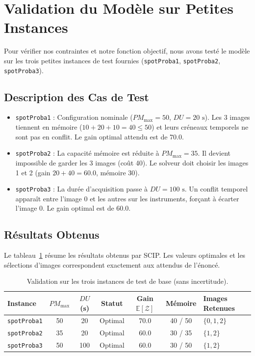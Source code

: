 \section{Validation du Modèle sur Petites Instances}

Pour vérifier nos contraintes et notre fonction objectif, nous avons testé le modèle sur les trois petites instances de test fournies (\texttt{spotProba1}, \texttt{spotProba2}, \texttt{spotProba3}).

\subsection{Description des Cas de Test}
\begin{itemize}
    \item \texttt{spotProba1} : Configuration nominale ($PM_{\max} = 50$, $DU = 20\text{ s}$). Les 3 images tiennent en mémoire ($10 + 20 + 10 = 40 \leq 50$) et leurs créneaux temporels ne sont pas en conflit. Le gain optimal attendu est de 70.0.
    \item \texttt{spotProba2} : La capacité mémoire est réduite à $PM_{\max} = 35$. Il devient impossible de garder les 3 images (coût 40). Le solveur doit choisir les images 1 et 2 (gain $20 + 40 = 60.0$, mémoire 30).
    \item \texttt{spotProba3} : La durée d'acquisition passe à $DU = 100\text{ s}$. Un conflit temporel apparaît entre l'image 0 et les autres sur les instruments, forçant à écarter l'image 0. Le gain optimal est de 60.0.
\end{itemize}

\subsection{Résultats Obtenus}
Le tableau~\ref{tab:validation} résume les résultats obtenus par SCIP. Les valeurs optimales et les sélections d'images correspondent exactement aux attendus de l'énoncé.

\begin{table}[H]
\centering
\small
\begin{tabularx}{\textwidth}{lcccccX}
\toprule
\textbf{Instance} & \textbf{$PM_{\max}$} & \textbf{$DU$ (s)} & \textbf{Statut} & \textbf{Gain $\mathbb{E}[\mathcal{Z}]$} & \textbf{Mémoire} & \textbf{Images Retenues} \\
\midrule
\texttt{spotProba1} & 50 & 20 & Optimal & 70.0 & 40 / 50 & $\{0, 1, 2\}$ \\
\texttt{spotProba2} & 35 & 20 & Optimal & 60.0 & 30 / 35 & $\{1, 2\}$ \\
\texttt{spotProba3} & 50 & 100 & Optimal & 60.0 & 30 / 50 & $\{1, 2\}$ \\
\bottomrule
\end{tabularx}
\caption{Validation sur les trois instances de test de base (sans incertitude).}
\label{tab:validation}
\end{table}

